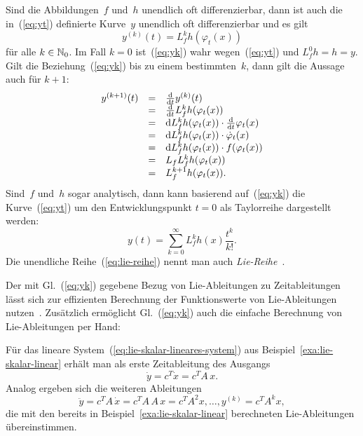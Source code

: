 Sind die Abbildungen~$f$ und~$h$ unendlich oft differenzierbar,
dann ist auch die in~(\ref{eq:yt}) definierte Kurve~$y$ unendlich
oft differenzierbar und es gilt 
\begin{equation}
y^{(k)}(t)=L_{f}^{k}h(\varphi_{t}(x))\label{eq:yk}
\end{equation}
für alle $k\in{\mathbb{N}_0}$. Im Fall $k=0$ ist~(\ref{eq:yk}) wahr wegen~(\ref{eq:yt})
und $L_{f}^{0}h=h=y$. Gilt die Beziehung~(\ref{eq:yk}) bis zu einem
bestimmten~$k$, dann gilt die Aussage auch für $k+1$: 
\[
\begin{array}{ccl}
y^{(k+1)}(t) & = & \frac{{\mathrm{d}}}{{\mathrm{d}} t}y^{(k)}(t)\\
 & = & \frac{{\mathrm{d}}}{{\mathrm{d}} t}L_{f}^{k}h(\varphi_{t}(x))\\
 & = & {\mathrm{d}} L_{f}^{k}h(\varphi_{t}(x))\cdot\frac{{\mathrm{d}}}{{\mathrm{d}} t}\varphi_{t}(x)\\
 & = & {\mathrm{d}} L_{f}^{k}h(\varphi_{t}(x))\cdot\dot{\varphi}_{t}(x)\\
 & = & {\mathrm{d}} L_{f}^{k}h(\varphi_{t}(x))\cdot f(\varphi_{t}(x))\\
 & = & L_{f}L_{f}^{k}h(\varphi_{t}(x))\\
 & = & L_{f}^{k+1}h(\varphi_{t}(x)).
\end{array}
\]
Sind~$f$ und~$h$ sogar analytisch, dann kann basierend auf~(\ref{eq:yk})
die Kurve~(\ref{eq:yt}) um den Entwicklungspunkt $t=0$ als Taylor\-reihe
dargestellt werden:
\begin{equation}
y(t)=\sum_{k=0}^{\infty}L_{f}^{k}h(x)\frac{t^{k}}{k!}.\label{eq:lie-reihe}
\end{equation}
Die unendliche Reihe~(\ref{eq:lie-reihe}) nennt man auch \emph{Lie-Reihe}~\cite{groebner1967}. 

Der mit Gl.~(\ref{eq:yk}) gegebene Bezug von Lie-Ableitungen zu
Zeitableitungen lässt sich zur effizienten Berechnung der Funktionswerte
von Lie-Ableitungen nutzen~\cite{roebenack2000at,roebenack2005pamm}.
Zusätzlich ermöglicht Gl.~(\ref{eq:yk}) auch die einfache Berechnung
von Lie-Ableitungen per Hand:

\begin{example}
\label{exa:lie-skalar-linear-zeitableitung}Für das lineare System~(\ref{eq:lie-skalar-lineares-system})
aus Beispiel~\ref{exa:lie-skalar-linear} erhält man als erste Zeitableitung
des Ausgangs 
\[
\dot{y}=c^{T}\dot{x}=c^{T}A\,x.
\]
Analog ergeben sich die weiteren Ableitungen 
\[
\ddot{y}=c^{T}A\,\dot{x}=c^{T}A\,A\,x=c^{T}A^{2}x,\ldots,y^{(k)}=c^{T}A^{k}x,
\]
die mit den bereits in Beispiel~\ref{exa:lie-skalar-linear} berechneten
Lie-Ableitungen übereinstimmen.
\end{example}

